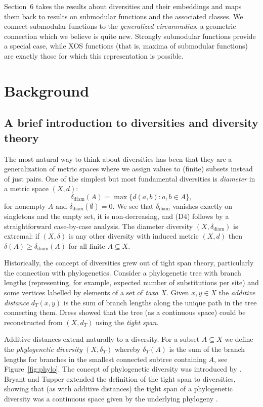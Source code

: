 \documentclass{article}
\theoremstyle{plain}
\theoremstyle{definition}
\newcommand{\deltadiam}{\delta_{\mathrm{diam}}}
\begin{document}
Section~6 takes the results about diversities and their embeddings and maps them back to results on submodular functions and the associated classes. We connect submodular functions to the {\em generalized circumradius}, a geometric connection which we believe is quite new. Strongly submodular functions provide a special case, while XOS functions (that is, maxima of submodular functions) are exactly those for which this representation is possible.




\section{Background}

\subsection{A brief introduction to diversities and diversity theory}

The most natural way to think about diversities has been that they are a generalization of metric spaces where we assign values to (finite) subsets instead of just pairs. One of the simplest but most fundamental diversities is {\em diameter} in a metric space $(X,d)$:
\[ \deltadiam(A) = \max\{d(a,b):a,b  \in A \},\]
for nonempty $A$ and $\deltadiam(\emptyset)=0$.
We see that $\deltadiam$ vanishes exactly on singletons and the empty set, it is non-decreasing, and (D4) follows by a straightforward case-by-case analysis.  The diameter diversity $(X,\deltadiam)$  is extremal: if $(X,\delta)$ is any other diversity with induced metric $(X,d)$ then  $\delta(A) \geq \deltadiam(A)$ for all finite $A \subseteq X$. 

Historically, the concept of diversities grew out of tight span theory, particularly the connection with phylogenetics. Consider a phylogenetic tree with branch lengths (representing, for example, expected number of substitutions per site) and some vertices labelled by elements of a set of {\em taxa} $X$. Given $x,y \in X$ the {\em additive distance} $d_T(x,y)$ is the sum of branch lengths along the unique path in the tree connecting them. Dress \cite{dress1984trees} showed that the tree (as a continuous space) could be reconstructed from $(X,d_T)$ using the {\em tight span}. 

Additive distances extend naturally to a diversity. For a subset $A \subseteq X$ we define the {\em phylogenetic diversity} $(X,\delta_T)$ whereby $\delta_T(A)$ is the sum of the branch lengths for branches in the smallest connected subtree containing $A$, see Figure~\ref{fig:phylo}. The concept of phylogenetic diversity was introduced by \cite{Faith92}. Bryant and Tupper extended the definition of the tight span to diversities, showing that (as with additive distances) the tight span of a phylogenetic diversity was a continuous space given by the underlying phylogeny \cite{BryantTupper12}. 
\end{document}
